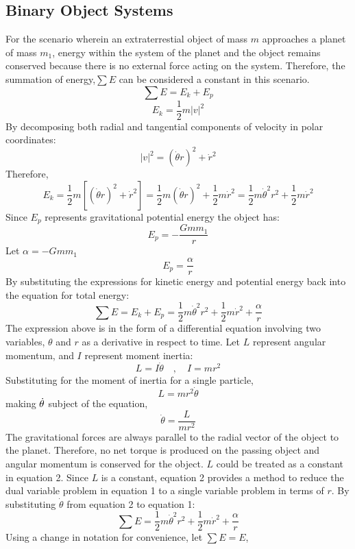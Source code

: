 \documentclass[class=report, 12pt, crop=false]{standalone}
\begin{document}
\begin{center}
\chapter{Binary Object Systems}
\begin{comment}
\end{comment}
\begin{comment}
\end{comment}
For the scenario wherein an extraterrestial object of mass $m$ approaches a planet of mass $m_1$, energy within the system of the planet and the object remains conserved because there is no external force acting on the system. Therefore, the summation of energy,$\sum E$ can be considered a constant in this scenario.
$$\sum E = E_k + E_p$$
$$E_k =\frac{1}{2}  m |v|^2$$
By decomposing both radial and tangential components of velocity in polar coordinates:
$$|v|^2 = (\dot{\theta}r)^2 + \dot{r}^2$$
Therefore, 
$$E_k = \frac{1}{2}m[(\dot{\theta}r)^2 + \dot{r}^2] = \frac{1}{2}m(\dot{\theta}r)^2 + \frac{1}{2}m\dot{r}^2 = \frac{1}{2}m\dot{\theta}^2 r^2 + \frac{1}{2}m\dot{r}^2$$
Since $E_p$ represents gravitational potential energy the object has:
$$E_p = -\frac{Gmm_1}{r}$$
Let $\alpha = -Gmm_1$
$$E_p = \frac{\alpha}{r}$$
By substituting the expressions for kinetic energy and potential energy back into the equation for total energy:
$$\sum E = E_k + E_p = \frac{1}{2}m\dot{\theta}^2 r^2 + \frac{1}{2}m\dot{r}^2 + \frac{\alpha}{r}$$
The expression above is in the form of a differential equation involving two variables, $\theta$ and $r$ as a derivative in respect to time. Let $L$ represent angular momentum, and $I$ represent moment inertia:
$$L = I \dot{\theta} \quad,\quad I = mr^2$$
Substituting for the moment of inertia for a single particle,
$$L =  mr^2\dot{\theta}$$
making $\displaystyle{\dot{\theta}}$ subject of the equation,
$$\dot{\theta} = \frac{L}{mr^2}$$
The gravitational forces are always parallel to the radial vector of the object to the planet. Therefore, no net torque is produced on the passing object and angular momentum is conserved for the object. $L$ could be treated as a constant in equation 2. Since $L$ is a constant, equation 2 provides a method to reduce the dual variable problem in equation 1 to a single variable problem in terms of $r$. By substituting $\dot{\theta}$ from equation 2 to equation 1:
$$\sum E = \frac{1}{2}m\dot{\theta}^2r^2 + \frac{1}{2}m\dot{r}^2 +\frac{\alpha}{r}$$
Using a change in notation for convenience, let $\sum E = E$,

\end{center}
\end{document}
